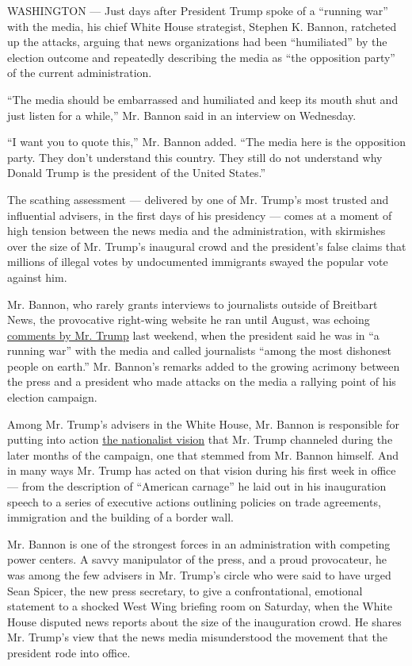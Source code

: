 WASHINGTON --- Just days after President Trump spoke of a ``running
war'' with the media, his chief White House strategist, Stephen K.
Bannon, ratcheted up the attacks, arguing that news organizations had
been ``humiliated'' by the election outcome and repeatedly describing
the media as ``the opposition party'' of the current administration.

``The media should be embarrassed and humiliated and keep its mouth shut
and just listen for a while,'' Mr. Bannon said in an interview on
Wednesday.

``I want you to quote this,'' Mr. Bannon added. ``The media here is the
opposition party. They don't understand this country. They still do not
understand why Donald Trump is the president of the United States.''

The scathing assessment --- delivered by one of Mr. Trump's most trusted
and influential advisers, in the first days of his presidency --- comes
at a moment of high tension between the news media and the
administration, with skirmishes over the size of Mr. Trump's inaugural
crowd and the president's false claims that millions of illegal votes by
undocumented immigrants swayed the popular vote against him.

Mr. Bannon, who rarely grants interviews to journalists outside of
Breitbart News, the provocative right-wing website he ran until August,
was echoing
\href{https://www.nytimes.com/2017/01/21/us/politics/trump-white-house-briefing-inauguration-crowd-size.html}{comments
by Mr. Trump} last weekend, when the president said he was in ``a
running war'' with the media and called journalists ``among the most
dishonest people on earth.'' Mr. Bannon's remarks added to the growing
acrimony between the press and a president who made attacks on the media
a rallying point of his election campaign.

Among Mr. Trump's advisers in the White House, Mr. Bannon is responsible
for putting into action
\href{https://www.nytimes.com/2016/11/15/us/politics/stephen-bannon-white-house-trump.html}{the
nationalist vision} that Mr. Trump channeled during the later months of
the campaign, one that stemmed from Mr. Bannon himself. And in many ways
Mr. Trump has acted on that vision during his first week in office ---
from the description of ``American carnage'' he laid out in his
inauguration speech to a series of executive actions outlining policies
on trade agreements, immigration and the building of a border wall.

Mr. Bannon is one of the strongest forces in an administration with
competing power centers. A savvy manipulator of the press, and a proud
provocateur, he was among the few advisers in Mr. Trump's circle who
were said to have urged Sean Spicer, the new press secretary, to give a
confrontational, emotional statement to a shocked West Wing briefing
room on Saturday, when the White House disputed news reports about the
size of the inauguration crowd. He shares Mr. Trump's view that the news
media misunderstood the movement that the president rode into office.

